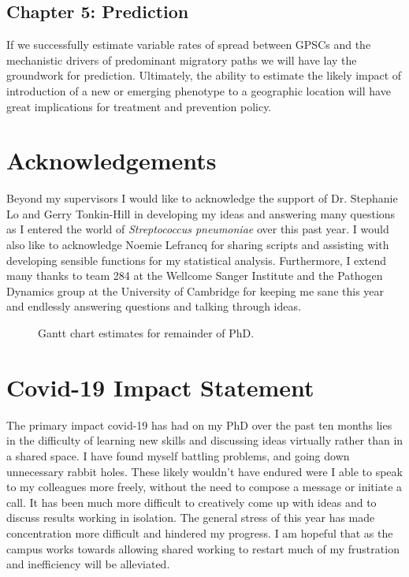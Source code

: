 \documentclass{article}
\newcommand{\beginsupplement}{%
        \setcounter{table}{0}
        \renewcommand{\thetable}{S\arabic{table}}%
        \setcounter{figure}{0}
        \renewcommand{\thefigure}{S\arabic{figure}}%
     }
\begin{document}
\subsection{Chapter 5: Prediction}
If we successfully estimate variable rates of spread between GPSCs and the mechanistic drivers of predominant migratory paths we will have lay the groundwork for prediction. Ultimately, the ability to estimate the likely impact of introduction of a new or emerging phenotype to a geographic location will have great implications for treatment and prevention policy. 
\section{Acknowledgements}
Beyond my supervisors I would like to acknowledge the support of Dr. Stephanie Lo and Gerry Tonkin-Hill in developing my ideas and answering many questions as I entered the world of \textit{Streptococcus pneumoniae} over this past year. I would also like to acknowledge Noemie Lefrancq for sharing scripts and assisting with developing sensible functions for my statistical analysis. Furthermore, I extend many thanks to team 284 at the Wellcome Sanger Institute and the Pathogen Dynamics group at the University of Cambridge for keeping me sane this year and endlessly answering questions and talking through ideas. 
\clearpage
\begin{figure}
\centering
    \caption{Gantt chart estimates for remainder of PhD.}
      \label{fig:gantt}
\end{figure}
\clearpage
\printbibliography
\clearpage
\section{Covid-19 Impact Statement}
The primary impact covid-19 has had on my PhD over the past ten months lies in the difficulty of learning new skills and discussing ideas virtually rather than in a shared space. I have found myself battling problems, and going down unnecessary rabbit holes. These likely wouldn't have endured were I able to speak to my colleagues more freely, without the need to compose a message or initiate a call. It has been much more difficult to creatively come up with ideas and to discuss results working in isolation. The general stress of this year has made concentration more difficult and hindered my progress. I am hopeful that as the campus works towards allowing shared working to restart much of my frustration and inefficiency will be alleviated.
\beginsupplement
\end{document}
